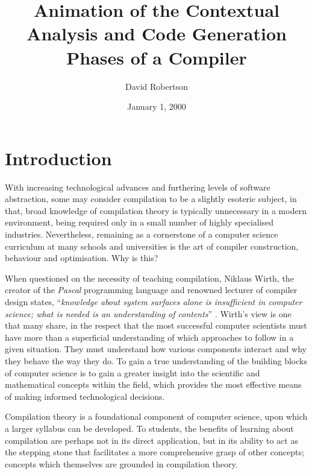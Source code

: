 \documentclass{l4proj}
\begin{document}
\title{Animation of the Contextual Analysis and Code Generation Phases of a Compiler}
\author{David Robertson}
\date{January 1, 2000}
\maketitle

\begin{abstract}

\end{abstract}

\educationalconsent
%
%
\tableofcontents

\chapter{Introduction}
With increasing technological advances and furthering levels of software abstraction, some may consider compilation to be a slightly esoteric subject, in that, broad knowledge of compilation theory is typically unnecessary in a modern environment, being required only in a small number of highly specialised industries. Nevertheless, remaining as a cornerstone of a computer science curriculum at many schools and universities is the art of compiler construction, behaviour and optimisation. Why is this?

When questioned on the necessity of teaching compilation, Niklaus Wirth, the creator of the \textit{Pascal} programming language and renowned lecturer of compiler design states, ``\textit{knowledge about system surfaces alone is insufficient in computer science; what is needed is an understanding of contents}'' \cite{WirthTheory}. Wirth's view is one that many share, in the respect that the most successful computer scientists must have more than a superficial understanding of which approaches to follow in a given situation. They must understand how various components interact and why they behave the way they do. To gain a true understanding of the building blocks of computer science is to gain a greater insight into the scientific and mathematical concepts within the field, which provides the most effective means of making informed technological decisions. 

Compilation theory is a foundational component of computer science, upon which a larger syllabus can be developed. To students, the benefits of learning about compilation are perhaps not in its direct application, but in its ability to act as the stepping stone that facilitates a more comprehensive grasp of other concepts; concepts which themselves are grounded in compilation theory.  
\end{document}
